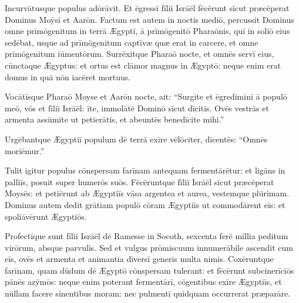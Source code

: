 Incurvātusque populus adōrāvit. Et ēgressī
fīliī Isrāēl fēcērunt sīcut præcēperat Dominus
Moȳsī et Aarōn. Factum est autem in noctis mediō, percussit Dominus omne
prīmōgenitum in terrā Ægyptī, ā prīmōgenitō
Pharaōnis, quī in soliō eius sedēbat, usque ad prīmōgenitum
captīvæ quæ erat in carcere, et omne prīmōgenitum
iūmentōrum. Surrēxitque Pharaō nocte, et omnēs
servī eius, cūnctaque Ægyptus: et ortus est clāmor magnus in Ægyptō:
neque enim erat domus in quā nōn iacēret mortuus. 

Vocātīsque Pharaō
Moyse et Aarōn nocte, ait: ``Surgite et ēgrediminī ā populō
meō, vōs et fīliī Isrāēl: īte, immolātē Dominō sīcut dīcitis. Ovēs
vestrās et armenta assūmite ut petierātis, et abeuntēs
benedīcite mihi.''

Urgēbantque Ægyptiī
populum dē terrā exīre vēlōciter, dīcentēs: ``Omnēs moriēmur.''

Tulit
igitur populus cōnspersam farīnam antequam
fermentārētur: et ligāns in palliīs, posuit super
humerōs suōs. Fēcēruntque fīliī Isrāēl sīcut præcēperat
Moysēs: et petiērunt ab Ægyptiīs vāsa argentea et aurea, vestemque
plūrimam. Dominus autem dedit grātiam populō cōram Ægyptiīs ut
commodārent eīs: et spoliāvērunt Ægyptiōs. 

Profectīque sunt fīliī Isrāēl dē Ramesse
in Socoth, sexcenta ferē mīllia peditum virōrum, absque parvulīs. Sed et
vulgus prōmiscuum innumerābile ascendit cum eīs, ovēs et armenta et
animantia dīversī generis multa
nimis. Coxēruntque farīnam, quam dūdum dē Ægyptō
cōnspersam tulerant: et fēcērunt subcinerīciōs pānēs
azȳmōs: neque enim poterant fermentārī, cōgentibus exīre
Ægyptiīs, et nūllam facere sinentibus moram: nec pulmentī
quidquam occurrerat præparāre.

